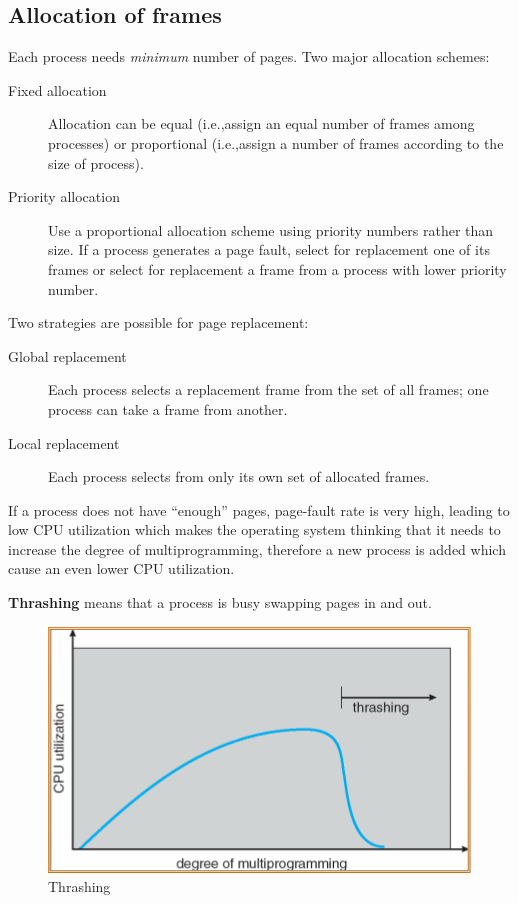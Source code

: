 \subsection{Allocation of frames}
Each process needs \emph{minimum} number of pages. Two major allocation schemes:
\begin{description}
\item [Fixed allocation] Allocation can be equal (i.e.,\@ assign an equal number of frames among processes) or proportional (i.e.,\@ assign a number of frames according to the size of process).
\item [Priority allocation] Use a proportional allocation scheme using priority numbers rather than size. If a process generates a page fault, select for replacement one of its frames or select for replacement a frame from a process with lower priority number.
\end{description}
Two strategies are possible for page replacement:
\begin{description}
\item [Global replacement] Each process selects a replacement frame from the set of all frames; one process can take a frame from another.
\item [Local replacement] Each process selects from only its own set of allocated frames.
\end{description}
If a process does not have ``enough'' pages, page-fault rate is very high, leading to low CPU utilization which makes the operating system thinking that it needs to increase the degree of multiprogramming, therefore a new process is added which cause an even lower CPU utilization.

\textbf{Thrashing} means that a process is busy swapping pages in and out.

\begin{figure}[hbtp]
\centering
\includegraphics[scale=0.4]{images/virtual_memory/thrashing.jpg}
\caption{Thrashing}
\end{figure}

